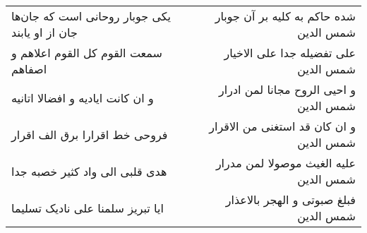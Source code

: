 \begin{center}
\begin{longtable}{l p{0.5cm} r}
\\
یکی جوبار روحانی است که جان‌ها جان از او یابند
&&
شده حاکم به کلیه بر آن جوبار شمس الدین
\\
سمعت القوم کل القوم اعلاهم و اصفاهم
&&
علی تفضیله جدا علی الاخیار شمس الدین
\\
و ان کانت ایادیه و افضالا اتانیه
&&
و احیی الروح مجانا لمن ادرار شمس الدین
\\
فروحی خط اقرارا برق الف اقرار
&&
و ان کان قد استغنی من الاقرار شمس الدین
\\
هدی قلبی الی واد کثیر خصبه جدا
&&
علیه الغیث موصولا لمن مدرار شمس الدین
\\
ایا تبریز سلمنا علی نادیک تسلیما
&&
فبلغ صبوتی و الهجر بالاعذار شمس الدین
\\
\end{longtable}
\end{center}
